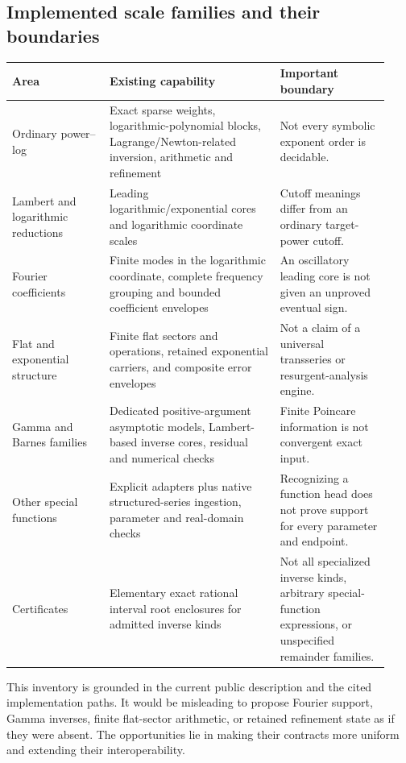 \documentclass[11pt,a4paper]{article}
\begin{document}
\subsection{Implemented scale families and their boundaries}
\begin{longtable}{@{}P{0.24\linewidth}P{0.42\linewidth}P{0.27\linewidth}@{}}
\toprule
Area & Existing capability & Important boundary\\\midrule
\endhead
Ordinary power--log & Exact sparse weights, logarithmic-polynomial blocks,
Lagrange/Newton-related inversion, arithmetic and refinement & Not every
symbolic exponent order is decidable.\\
Lambert and logarithmic reductions & Leading logarithmic/exponential cores
and logarithmic coordinate scales & Cutoff meanings differ from an ordinary
target-power cutoff.\\
Fourier coefficients & Finite modes in the logarithmic coordinate, complete
frequency grouping and bounded coefficient envelopes & An oscillatory
leading core is not given an unproved eventual sign.\\
Flat and exponential structure & Finite flat sectors and operations,
retained exponential carriers, and composite error envelopes & Not a claim
of a universal transseries or resurgent-analysis engine.\\
Gamma and Barnes families & Dedicated positive-argument asymptotic models,
Lambert-based inverse cores, residual and numerical checks & Finite
Poincare information is not convergent exact input.\\
Other special functions & Explicit adapters plus native structured-series
ingestion, parameter and real-domain checks & Recognizing a function head
does not prove support for every parameter and endpoint.\\
Certificates & Elementary exact rational interval root enclosures for
admitted inverse kinds & Not all specialized inverse kinds, arbitrary
special-function expressions, or unspecified remainder families.\\
\bottomrule
\end{longtable}
This inventory is grounded in the current public description and the cited
implementation paths. It would be misleading to propose Fourier support,
Gamma inverses, finite flat-sector arithmetic, or retained refinement state
as if they were absent. The opportunities lie in making their contracts
more uniform and extending their interoperability.\cite{readme,fourier,native,gamma,special,certificates,refinement}
\end{document}
